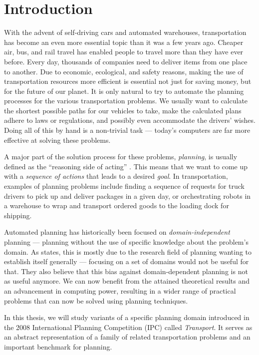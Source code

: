 \chapter*{Introduction}

With the advent of self-driving cars and automated warehouses, transportation has become an even more essential topic than it was a few years ago.
Cheaper air, bus, and rail travel has enabled people to travel more than they have ever before.
Every day, thousands of companies need to deliver items from
one place to another. Due to economic, ecological, and safety reasons, making the use of transportation resources more efficient is essential not just for saving money,
but for the future of our planet.
It is only natural to try to automate the planning processes for the various transportation problems.
We usually want to calculate the shortest possible paths for our vehicles to take,
make the calculated plans adhere to laws or regulations, and possibly even accommodate the drivers'
wishes. Doing all of this by hand is a non-trivial task --- today's computers
are far more effective at solving these problems.

A major part of the solution process for these problems, \textit{planning}, is usually defined as the ``reasoning side of acting'' \citep[Section~1.1]{Ghallab2004}.
This means that we want to come up with a \textit{sequence of actions} that leads to a desired \textit{goal}.
In transportation, examples of planning problems include finding a sequence of 
requests for truck drivers to pick up and deliver packages in a given day,
or orchestrating robots in a warehouse to wrap and transport ordered goods to the loading dock for shipping.

Automated planning has historically been focused on \textit{domain-independent} planning --- planning without
the use of specific knowledge about the problem's domain.
As \citet{Nau2007} states, this is mostly due to the research field of planning wanting to
establish itself generally --- focusing on a set of domains would not be useful for that.
They also believe that this bias against domain-dependent planning is not as useful anymore.
We can now benefit from the attained theoretical results and an advancement in computing power,
resulting in a wider range of practical problems that can now be solved using planning techniques.

In this thesis, we will study variants of a specific planning domain introduced in the 2008 International Planning Competition (IPC) called \textit{Transport}. It serves as an abstract representation of a family of related transportation problems
and an important benchmark for planning.

